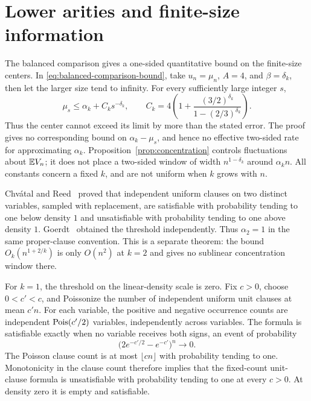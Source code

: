 \section{Lower arities and finite-size information}\label{sec:boundaries}

The balanced comparison gives a one-sided quantitative bound on the
finite-size centers. In \eqref{eq:balanced-comparison-bound}, take
\(u_n=\mu_n\), \(A=4\), and \(\beta=\delta_k\), then let the larger
size tend to infinity. For every sufficiently large integer \(s\),
\begin{equation}\label{eq:one-sided-center-rate}
 \mu_s\le\alpha_k+C_k s^{-\delta_k},\qquad
 C_k=4\left(1+\frac{(3/2)^{\delta_k}}
                         {1-(2/3)^{\delta_k}}\right).
\end{equation}
Thus the center cannot exceed its limit by more than the stated error.
The proof gives no corresponding bound on \(\alpha_k-\mu_s\), and
hence no effective two-sided rate for approximating \(\alpha_k\).
Proposition~\ref{prop:concentration} controls fluctuations about
\(\mathbb E V_n\); it does not place a two-sided window of width
\(n^{1-\delta_k}\) around \(\alpha_kn\). All constants concern a fixed
\(k\), and are not uniform when \(k\) grows with \(n\).

\begin{remark}\label{rem:two}
Chv\'atal and Reed~\cite[Theorems~3--4]{CR} proved that independent
uniform clauses on two distinct variables, sampled with replacement,
are satisfiable with probability tending to one below density \(1\)
and unsatisfiable with probability tending to one above density \(1\).
Goerdt~\cite{Goerdt} obtained the threshold independently.
Thus \(\alpha_2=1\) in the same proper-clause convention. This is a
separate theorem: the bound \(O_k(n^{1+2/k})\) is only \(O(n^2)\) at
\(k=2\) and gives no sublinear concentration window there.
\end{remark}

\begin{remark}\label{rem:unit}
For \(k=1\), the threshold on the linear-density scale is zero.
Fix \(c>0\), choose \(0<c'<c\), and Poissonize the number of independent
uniform unit clauses at mean \(c'n\). For each variable, the positive
and negative occurrence counts are independent \(\operatorname{Pois}(c'/2)\)
variables, independently across variables. The formula is satisfiable
exactly when no variable receives both signs, an event of probability
\[
 \bigl(2e^{-c'/2}-e^{-c'}\bigr)^n\longrightarrow0.
\]
The Poisson clause count is at most \(\lfloor cn\rfloor\) with
probability tending to one. Monotonicity in the clause count therefore
implies that the fixed-count unit-clause formula is unsatisfiable with
probability tending to one at every \(c>0\). At density zero it is
empty and satisfiable.
\end{remark}
